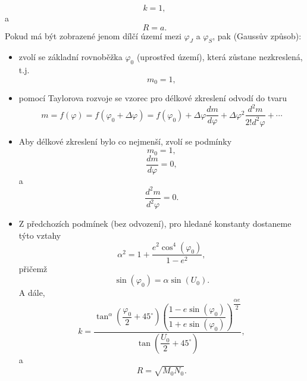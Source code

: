 \begin{equation}
k = 1,
\end{equation}
a
\begin{equation}
R = a.
\end{equation}
Pokud má být zobrazené jenom dílčí území mezi  $\varphi_{J}$ a $\varphi_{S}$, pak (Gaussův způsob):
\begin{itemize}
\item zvolí se základní rovnoběžka $\varphi_{0}$ (uprostřed území), která zůstane nezkreslená, t.j.
\begin{equation}
m_{0} = 1,
\end{equation}
\item pomocí Taylorova rozvoje se vzorec pro délkové zkreslení odvodí do tvaru
\begin{equation}
m = f\left(\varphi\right) = f\left(\varphi_{0}+\Delta\varphi\right) = f\left(\varphi_{0}\right) + \Delta\varphi\dfrac{dm}{d\varphi} + \Delta\varphi^{2}\dfrac{d^{2}m}{2! d^{2}\varphi} + \cdots 
\end{equation}
\item Aby délkové zkreslení bylo co nejmenší, zvolí se podmínky
\begin{equation}
m_{0} = 1,
\end{equation}
\begin{equation}
\dfrac{dm}{d\varphi} = 0, 
\end{equation}
a
\begin{equation}
\dfrac{d^{2}m}{d^{2}\varphi} = 0.
\end{equation}
\item Z předchozích podmínek (bez odvození), pro hledané konstanty dostaneme týto vztahy
\begin{equation}
\alpha^{2} = 1+\dfrac{e^{2}\cos^{4}{\left(\varphi_{0}\right)}}{1-e^{2}},
\end{equation}
přičemž
\begin{equation}
\sin{\left(\varphi_{0}\right)} = \alpha\sin{\left(U_{0}\right)}.
\end{equation}
A dále, 
\begin{equation}
k = \dfrac{\tan^{\alpha}{\left(\dfrac{\varphi_{0}}{2}+45^{\circ}\right)}\left(\dfrac{1-e\sin{\left(\varphi_{0}\right)}}{1+e\sin{\left(\varphi_{0}\right)}}\right)^{\dfrac{\alpha e}{2}}}{\tan{\left(\dfrac{U_{0}}{2}+45^{\circ}\right)}},
\end{equation}
a
\begin{equation}
R = \sqrt{M_{0}N_{0}}.
\end{equation}
\end{itemize} 

